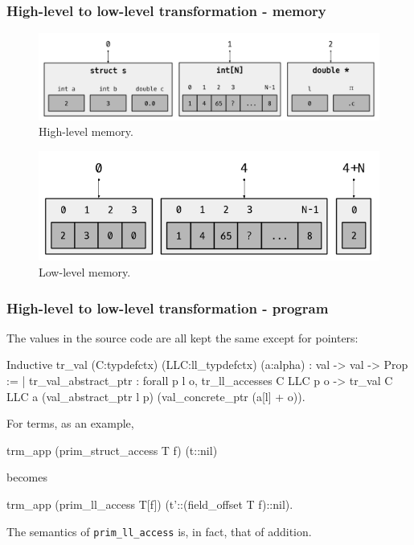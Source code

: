 \begin{frame}[fragile]
\frametitle{High-level to low-level transformation - memory}

\begin{center}

\begin{figure}
	\includegraphics[scale=0.31]{images/high_level_memory}
	\caption{High-level memory.}
\end{figure}

\begin{figure}
	\includegraphics[scale=0.31]{images/low_level_memory}
	\caption{Low-level memory.}
\end{figure}

\end{center}

\end{frame}


\begin{frame}[fragile]
\frametitle{High-level to low-level transformation - program}

The values in the source code  are all kept the same except for pointers:

\begin{coqs}
Inductive tr_val (C:typdefctx) (LLC:ll_typdefctx) (a:alpha) : val -> val -> Prop :=
	| tr_val_abstract_ptr : forall p l o,
      	tr_ll_accesses C LLC p o ->
      	tr_val C LLC a (val_abstract_ptr l p) (val_concrete_ptr (a[l] + o)).
\end{coqs}

\bigskip \pause

For terms, as an example,

\begin{coqs}
  trm_app (prim_struct_access T f) (t::nil)
\end{coqs}

becomes

\begin{coqs}
  trm_app (prim_ll_access T[f]) (t'::(field_offset T f)::nil).
\end{coqs}

\bigskip \pause

The semantics of \texttt{prim\_ll\_access} is, in fact, that of addition.

\end{frame}


